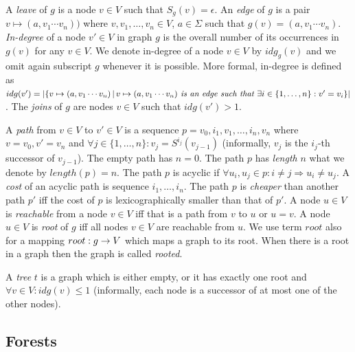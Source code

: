 A \emph{leave} of $g$ is a node $v \in V$ such that $S_g(v) = \epsilon$.
An \emph{edge} of $g$ is a pair $v \mapsto (a, v_1 \cdots v_n))$ where $v, v_1, \ldots, v_n \in V$,
$a \in \Sigma$ such that $g(v) = (a, v_1 \cdots v_n)$.
\emph{In-degree} of a node $v' \in V$ in graph $g$ is the overall number of its occurrences in $g(v)$ for any $v \in V$.
We denote in-degree of a node $v \in V$ by $idg_g(v)$ and we omit again subscript $g$ whenever it is possible.
More formal, in-degree is defined as $idg(v') = |\{v \mapsto (a, v_1 \cdots v_n) \,|\, v \mapsto (a, v_1 \cdots v_n) \emph{ is an edge such that } \exists i \in \{1,\ldots,n\}: v' = v_i\}|$.
The \emph{joins} of $g$ are nodes $v \in V$ such that $idg(v') > 1$.

A \emph{path} from $v\in V$ to $v' \in V$ is a sequence $p=v_0, i_1, v_1, \ldots, i_n, v_n$ where $v=v_0, v' = v_n$
and $\forall j \in \{1,\ldots,n\}: v_j = S^{i_j}(v_{j-1})$ (informally, $v_j$ is the $i_j$-th successor of $v_{j-1}$).
The empty path has $n=0$.
The path $p$ has \emph{length} $n$ what we denote by $length(p) = n$.
The path $p$ is acyclic if $\forall u_i,u_j \in p: i \neq j \Rightarrow u_i \neq u_j$.
A \emph{cost} of an acyclic path is sequence $i_1, \ldots, i_n$.
The path $p$ is \emph{cheaper} than another path $p'$ iff the cost of $p$ is lexicographically smaller than that of $p'$. 
A node $u \in V$ is \emph{reachable} from a node $v \in V$ iff that is a path from $v$ to $u$ or $u=v$.
A node $u \in V$ is \emph{root} of $g$ iff all nodes $v \in V$ are reachable from $u$.
We use term $root$ also for a mapping $root: g \rightarrow V$ which maps a graph to its root.
When there is a root in a graph then the graph is called \emph{rooted}.

A \emph{tree} $t$ is a graph which is either empty, or it has exactly one root and $\forall v \in V: idg(v) \leq 1$ (informally,
each node is a successor of at most one of the other nodes).

\subsection{Forests}
\label{subsec:forests}

